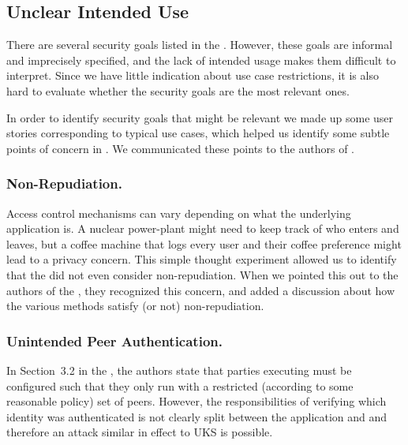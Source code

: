 \documentclass[runningheads]{llncs}
\begin{document}
\subsection{Unclear Intended Use}
\label{sec:unclearProtocolUse}
%
There are several security goals listed in the \mSpec{}.
%
However, these goals are informal and imprecisely specified, and the lack of
intended usage makes them difficult to interpret.
%
Since we have little indication about use case restrictions, it is also hard
to evaluate whether the security goals are the most relevant ones.
%

In order to identify security goals that might be relevant
we made up some user stories corresponding to typical use cases,
which helped us identify some subtle points of concern in \mEdhoc.
%
We communicated these points to the authors of \mEdhoc{}.
%

\subsubsection{Non-Repudiation.}
Access control mechanisms can vary depending on what the underlying application
is.
%
A nuclear power-plant might need to keep track of who enters and leaves, but a
coffee machine that logs every user and their coffee preference might lead to a
privacy concern.
%
This simple thought experiment allowed us to identify that the \mEdhoc{}
\mSpec{} did not even consider non-repudiation.
%
When we pointed this out to the authors of the \mSpec, they recognized this
concern, and added a discussion about how the various \mEdhoc{} methods
satisfy (or not) non-repudiation.
%

\subsubsection{Unintended Peer Authentication.}
\label{sec:unintendedPeerAuth}
In Section~3.2 in the \mSpec{}, the authors state that parties executing
\mEdhoc{} must be configured such that they only run \mEdhoc{} with a
restricted (according to some reasonable policy) set of peers.
%
However, the responsibilities of verifying which identity was authenticated is
not clearly split between the application and \mEdhoc{} and therefore an attack
similar in effect to UKS is possible.
%
\end{document}
